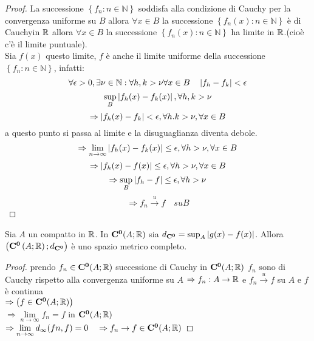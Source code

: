 \begin{proof}
	La successione $\left\{ f_n:n\in\mathbb{N}\right\}$ soddisfa alla condizione di Cauchy per la convergenza uniforme su $B$ allora $\forall x\in B$ la successione $\left\{ f_n(x) :n\in\mathbb{N} \right\}$ è di Cauchyin $ \mathbb{R}$ allora $\forall x \in B$ la successione $\left\{ f_n(x):n\in\mathbb{N} \right\}$ ha limite in $ \mathbb{R}$.(cioè c'è il limite puntuale).\\
	Sia $f(x)$ questo limite, $f$ è anche il limite uniforme della successione $\left\{ f_n:n\in\mathbb{N} \right\}$, infatti:
	$$\forall\epsilon>0, \exists\nu\in\mathbb{N}: \forall h,k>\nu \forall x\in B \quad \left|f_h-f_k\right|<\epsilon$$
	$$\sup\limits_B\left|f_h(x)-f_k(x)\right|, \forall h,k>\nu$$
	$$\Rightarrow \left|f_h(x)-f_k\right|<\epsilon,\forall h.k>\nu, \forall x \in B$$
	a questo punto si passa al limite e la disuguaglianza diventa debole.
	$$\Rightarrow \lim\limits_{n\to\infty}\left|f_h(x)-f_k(x)\right|\le\epsilon, \forall h>\nu, \forall x\in B$$
	$$\Rightarrow\left|f_h(x)-f(x)\right|\le\epsilon, \forall h>\nu, \forall x\in B$$
	$$\Rightarrow\sup\limits_B\left|f_h-f\right|\le\epsilon, \forall h>\nu$$
	$$\Rightarrow f_n\overset{u}{\to}f\quad su B$$
\end{proof}
\begin{proposition}
	\label{prop:compl_dist_spm_compl}
	Sia $A$ un compatto in $ \mathbb{R}$. In $\mathbf{C^{0}}(A; \mathbb{R})$ sia $d_{\mathbf{C^{0}}}=\sup_A\left|g(x)-f(x)\right|$. Allora $\left( \mathbf{C^{0}}\left(A; \mathbb{R}\right);d_{\mathbf{C^{0}}}\right)$ è uno spazio metrico completo.
	\begin{proof}
		prendo $f_n\in \mathbf{C^{0}}(A; \mathbb{R})$ successione di Cauchy in $\mathbf{C^{0}}(A; \mathbb{R})$
		$f_n$ sono di Cauchy rispetto alla convergenza uniforme su $A$
		$\Rightarrow f_n:A\to \mathbb{R}$ e $f_n\overset{u}{\to}f$ su $A$ e $f$ è continua\\ $\Rightarrow\left(f\in \mathbf{C^{0}}(A; \mathbb{R})\right)$\\
		$\Rightarrow\lim\limits_{n\to\infty}f_n=f$ in $\mathbf{C^{0}}(A; \mathbb{R})$\\
		$\Rightarrow\lim\limits_{n\to\infty}d_{\infty}(fn,f)=0\quad\Rightarrow f_n\to f\in \mathbf{C^{0}}(A; \mathbb{R})$
	\end{proof}
\end{proposition}
\begin{corollary} %
	\label{prop:compl_dist_spm_compl}
\end{corollary}


